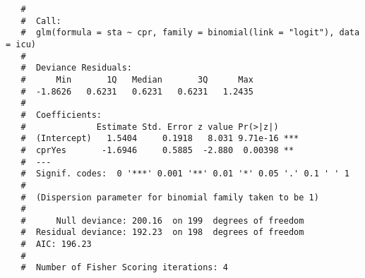 \documentclass[letterpaper,12pt,twoside,]{pinp}
\begin{document}
\begin{enumerate}
  \begin{ShadedResult}
   \begin{verbatim}
   #  
   #  Call:
   #  glm(formula = sta ~ cpr, family = binomial(link = "logit"), data = icu)
   #  
   #  Deviance Residuals: 
   #      Min       1Q   Median       3Q      Max  
   #  -1.8626   0.6231   0.6231   0.6231   1.2435  
   #  
   #  Coefficients:
   #              Estimate Std. Error z value Pr(>|z|)    
   #  (Intercept)   1.5404     0.1918   8.031 9.71e-16 ***
   #  cprYes       -1.6946     0.5885  -2.880  0.00398 ** 
   #  ---
   #  Signif. codes:  0 '***' 0.001 '**' 0.01 '*' 0.05 '.' 0.1 ' ' 1
   #  
   #  (Dispersion parameter for binomial family taken to be 1)
   #  
   #      Null deviance: 200.16  on 199  degrees of freedom
   #  Residual deviance: 192.23  on 198  degrees of freedom
   #  AIC: 196.23
   #  
   #  Number of Fisher Scoring iterations: 4
   \end{verbatim}
   \end{ShadedResult}
\end{enumerate}

\newpage
\end{document}
